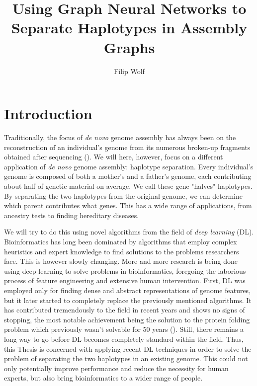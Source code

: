 \documentclass[times, utf8, diplomski, english]{fer_eng}
\begin{document}

\title{Using Graph Neural Networks to Separate Haplotypes in Assembly Graphs}

\author{Filip Wolf}

\maketitle



\zahvala{}

\tableofcontents

\chapter{Introduction}

Traditionally, the focus of \textit{de novo} genome assembly has always been on the reconstruction of an individual's genome from its numerous broken-up fragments obtained after sequencing (\cite{de_novo2}). We will here, however, focus on a different application of \textit{de novo} genome assembly: haplotype separation. Every individual's genome is composed of both a mother's and a father's genome, each contributing about half of genetic material on average. We call these gene "halves" haplotypes. By separating the two haplotypes from the original genome, we can determine which parent contributes what genes. This has a wide range of applications, from ancestry tests to finding hereditary diseases.

We will try to do this using novel algorithms from the field of \textit{deep learning} (DL). Bioinformatics has long been dominated by algorithms that employ complex heuristics and expert knowledge to find solutions to the problems researchers face. This is however slowly changing. More and more research is being done using deep learning to solve problems in bioinformatics, foregoing the laborious process of feature engineering and extensive human intervention. First, DL was employed only for finding dense and abstract representations of genome features, but it later started to completely replace the previously mentioned algorithms. It has contributed tremendously to the field in recent years and shows no signs of stopping, the most notable achievement being the solution to the protein folding problem which previously wasn't solvable for 50 years (\cite{alphafold}). Still, there remains a long way to go before DL becomes completely standard within the field. Thus, this Thesis is concerned with applying recent DL techniques in order to solve the problem of separating the two haplotypes in an existing genome. This could not only potentially improve performance and reduce the necessity for human experts, but also bring bioinformatics to a wider range of people.
\end{document}
